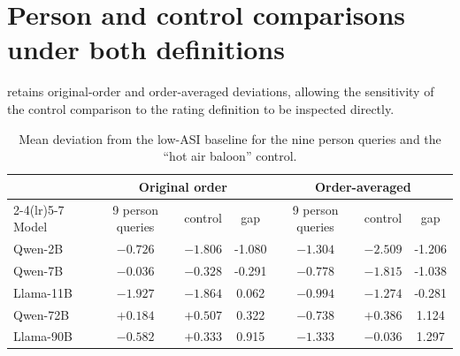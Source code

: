 \section{Person and control comparisons under both definitions}

 retains original-order and order-averaged
deviations, allowing the sensitivity of the control comparison to the
rating definition to be inspected directly.

\begin{table}[htbp]\centering\small
\begin{tabular}{@{}lcccccc@{}}
\toprule
& \multicolumn{3}{c}{Original order} & \multicolumn{3}{c}{Order-averaged} \\
\cmidrule(lr){2-4}\cmidrule(lr){5-7}
Model & 9 person queries & control & gap & 9 person queries & control & gap \\
\midrule
Qwen-2B & $-0.726$ & $-1.806$ & -1.080 & $-1.304$ & $-2.509$ & -1.206 \\
Qwen-7B & $-0.036$ & $-0.328$ & -0.291 & $-0.778$ & $-1.815$ & -1.038 \\
Llama-11B & $-1.927$ & $-1.864$ & 0.062 & $-0.994$ & $-1.274$ & -0.281 \\
Qwen-72B & $+0.184$ & $+0.507$ & 0.322 & $-0.738$ & $+0.386$ & 1.124 \\
Llama-90B & $-0.582$ & $+0.333$ & 0.915 & $-1.333$ & $-0.036$ & 1.297 \\
\bottomrule
\end{tabular}
\caption{Mean deviation from the low-ASI baseline for the nine person queries
and the ``hot air baloon'' control.}
\label{tab:app-s2-person-orders}
\end{table}
